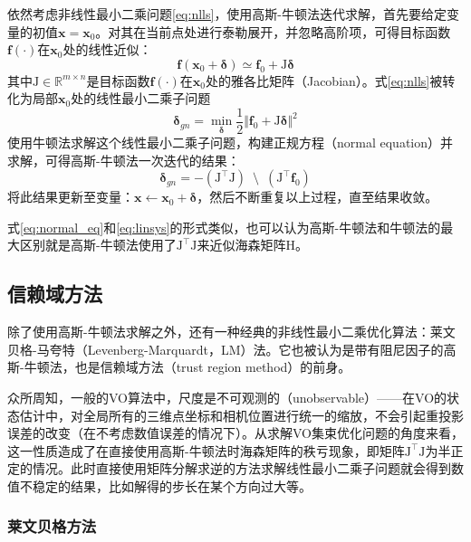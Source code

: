 依然考虑非线性最小二乘问题\eqref{eq:nlls}，使用高斯-牛顿法迭代求解，首先要给定变量的初值$\bm{x}=\bm{x}_0$。对其在当前点处进行泰勒展开，并忽略高阶项，可得目标函数$\mathbf{f}(\cdot)$在$\bm{x}_0$处的线性近似：
\begin{equation}
    \mathbf{f}(\bm{x}_0+\bm{\delta}) \simeq \mathbf{f}_0 + \mathrm{J}\bm{\delta}
\end{equation}
其中$\mathrm{J}\in\mathbb{R}^{m \times n}$是目标函数$\mathbf{f}(\cdot)$在$\bm{x}_0$处的雅各比矩阵（Jacobian）。式\eqref{eq:nlls}被转化为局部$\bm{x}_0$处的线性最小二乘子问题
\begin{equation}
    \bm{\delta}_{gn} =
        \min_{\bm{\delta}} \frac{1}{2}
        \Vert \mathbf{f}_0 + \mathrm{J}\bm{\delta} \Vert^2
    \label{eq:lls}
\end{equation}
使用牛顿法求解这个线性最小二乘子问题，构建正规方程（normal equation）并求解，可得高斯-牛顿法一次迭代的结果：
\begin{equation}
    \bm{\delta}_{gn} =
        -\left( \mathrm{J}^\top\mathrm{J} \right)
        \enspace\setminus\enspace
        \left( \mathrm{J}^\top\mathbf{f}_0 \right)
    \label{eq:normal_eq}
\end{equation}
将此结果更新至变量：$\bm{x}\leftarrow\bm{x}_0+\bm{\delta}$，然后不断重复以上过程，直至结果收敛。

式\eqref{eq:normal_eq}和\eqref{eq:linsys}的形式类似，也可以认为高斯-牛顿法和牛顿法的最大区别就是高斯-牛顿法使用了$\mathrm{J}^\top\mathrm{J}$来近似海森矩阵$\mathrm{H}$。

\subsection{信赖域方法}

除了使用高斯-牛顿法求解之外，还有一种经典的非线性最小二乘优化算法：莱文贝格-马夸特（Levenberg-Marquardt，LM）法。它也被认为是带有阻尼因子的高斯-牛顿法，也是信赖域方法（trust region method）的前身\citep{jorge2006numerical}。

众所周知，一般的VO算法中，尺度是不可观测的（unobservable）——在VO的状态估计中，对全局所有的三维点坐标和相机位置进行统一的缩放，不会引起重投影误差的改变（在不考虑数值误差的情况下）。从求解VO集束优化问题的角度来看，这一性质造成了在直接使用高斯-牛顿法时海森矩阵的秩亏现象，即矩阵$\mathrm{J}^\top\mathrm{J}$为半正定的情况。此时直接使用矩阵分解求逆的方法求解线性最小二乘子问题就会得到数值不稳定的结果，比如解得的步长在某个方向过大等。

\subsubsection*{莱文贝格方法}

